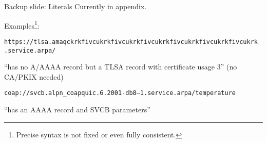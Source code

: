 \begin{frame}{Backup slide: Literals}\Large
    Currently in appendix.
    
    \bigskip

    Examples\footnote{Precise syntax is not fixed or even fully consistent.}:

    \normalsize

    \bigskip

    \texttt{https://tlsa.amaqckrkfivcukrkfivcukrkfivcukrkfivcukrkfivcukrkfivcukrk\\\qquad.service.arpa/}

    \bigskip

    ``has no A/AAAA record but a TLSA record with certificate usage 3'' (no CA/PKIX needed)

    \vspace{1cm}

    \texttt{coap://svcb.alpn\_coapquic.6.2001-db8--1.service.arpa/temperature}

    \bigskip

    ``has an AAAA record and SVCB parameters''
\end{frame}


